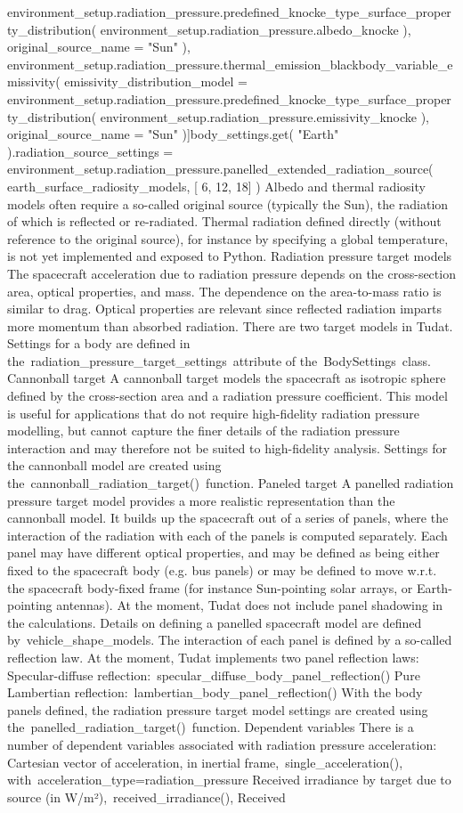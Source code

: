 environment_setup.radiation_pressure.predefined_knocke_type_surface_property_distribution( environment_setup.radiation_pressure.albedo_knocke ), original_source_name = "Sun" ), environment_setup.radiation_pressure.thermal_emission_blackbody_variable_emissivity( emissivity_distribution_model = environment_setup.radiation_pressure.predefined_knocke_type_surface_property_distribution( environment_setup.radiation_pressure.emissivity_knocke ), original_source_name = "Sun" )]body_settings.get( "Earth" ).radiation_source_settings = environment_setup.radiation_pressure.panelled_extended_radiation_source( earth_surface_radiosity_models, [ 6, 12, 18] ) Albedo and thermal radiosity models often require a so-called original source (typically the Sun), the radiation of which is reflected or re-radiated. Thermal radiation defined directly (without reference to the original source), for instance by specifying a global temperature, is not yet implemented and exposed to Python. Radiation pressure target models The spacecraft acceleration due to radiation pressure depends on the cross-section area, optical properties, and mass. The dependence on the area-to-mass ratio is similar to drag. Optical properties are relevant since reflected radiation imparts more momentum than absorbed radiation. There are two target models in Tudat. Settings for a body are defined in the radiation_pressure_target_settings attribute of the BodySettings class. Cannonball target A cannonball target models the spacecraft as isotropic sphere defined by the cross-section area and a radiation pressure coefficient. This model is useful for applications that do not require high-fidelity radiation pressure modelling, but cannot capture the finer details of the radiation pressure interaction and may therefore not be suited to high-fidelity analysis. Settings for the cannonball model are created using the cannonball_radiation_target() function. Paneled target A panelled radiation pressure target model provides a more realistic representation than the cannonball model. It builds up the spacecraft out of a series of panels, where the interaction of the radiation with each of the panels is computed separately. Each panel may have different optical properties, and may be defined as being either fixed to the spacecraft body (e.g. bus panels) or may be defined to move w.r.t. the spacecraft body-fixed frame (for instance Sun-pointing solar arrays, or Earth-pointing antennas). At the moment, Tudat does not include panel shadowing in the calculations. Details on defining a panelled spacecraft model are defined by vehicle_shape_models. The interaction of each panel is defined by a so-called reflection law. At the moment, Tudat implements two panel reflection laws: Specular-diffuse reflection: specular_diffuse_body_panel_reflection() Pure Lambertian reflection: lambertian_body_panel_reflection() With the body panels defined, the radiation pressure target model settings are created using the panelled_radiation_target() function. Dependent variables There is a number of dependent variables associated with radiation pressure acceleration: Cartesian vector of acceleration, in inertial frame, single_acceleration(), with acceleration_type=radiation_pressure Received irradiance by target due to source (in W/m²), received_irradiance(), Received 